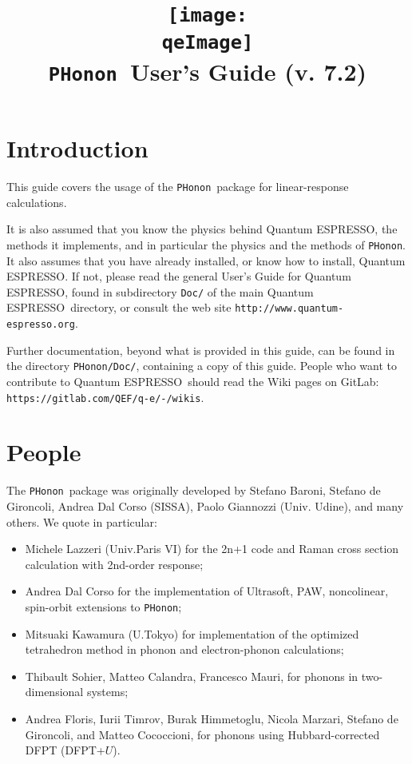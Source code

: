 \documentclass[12pt,a4paper]{article}
\def\version{7.2}
\def\qe{{\sc Quantum ESPRESSO}}
\def\PHonon{\texttt{PHonon}}
\begin{document}
 
\author{}
\date{}

\def\qeImage{../../Doc/quantum_espresso}

\title{
  \texttt{[image: \\qeImage]} \\
  \Huge \PHonon\ User's Guide (v. \version)
}

\maketitle

\tableofcontents

\section{Introduction}

This guide covers the usage of the \PHonon\ package for
linear-response calculations.

It is also assumed that you know the physics behind \qe,
the methods it implements, and in particular the physics
and the methods of \PHonon.
It also assumes that you have already installed,
or know how to install, \qe. If not, please read
the general User's Guide for \qe, found in 
subdirectory \texttt{Doc/} of the main \qe\ directory,
or consult the web site \texttt{http://www.quantum-espresso.org}.

Further documentation, beyond what is provided 
in this guide, can be found in the directory
\texttt{PHonon/Doc/}, containing a copy of this guide.
People who want to contribute to \qe\ should read the
Wiki pages on GitLab: \texttt{https://gitlab.com/QEF/q-e/-/wikis}.

\section{People}
The \PHonon\ package
was originally developed by Stefano Baroni, Stefano
de Gironcoli, Andrea Dal Corso (SISSA), Paolo Giannozzi (Univ. Udine), 
and many others.
We quote in particular:
\begin{itemize}
  \item Michele Lazzeri (Univ.Paris VI) for the 2n+1 code and Raman 
  cross section calculation with 2nd-order response;
  \item Andrea Dal Corso for the implementation of Ultrasoft, PAW,
        noncolinear, spin-orbit extensions to \PHonon;
  \item Mitsuaki Kawamura (U.Tokyo) for implementation of the optimized
        tetrahedron method in phonon and electron-phonon calculations;
  \item Thibault Sohier, Matteo Calandra, Francesco Mauri, for 
	phonons in two-dimensional systems;
  \item Andrea Floris, Iurii Timrov, Burak Himmetoglu, Nicola Marzari, 
        Stefano de Gironcoli, and Matteo Cococcioni, for phonons using 
        Hubbard-corrected DFPT (DFPT+$U$).
\end{itemize}
\end{document}
